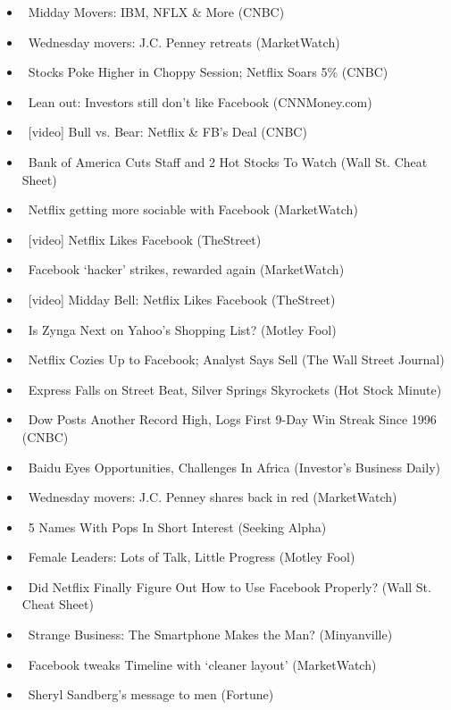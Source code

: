 \documentclass[11pt,asymmetric]{article}
\begin{document}
\begin{itemize}
\item\ Midday Movers: IBM, NFLX \& More (CNBC)
\item\ Wednesday movers: J.C. Penney retreats (MarketWatch)
\item\ Stocks Poke Higher in Choppy Session; Netflix Soars 5\% (CNBC)
\item\ Lean out: Investors still don't like Facebook (CNNMoney.com)
\item\ [video] Bull vs. Bear: Netflix \& FB's Deal (CNBC)
\item\ Bank of America Cuts Staff and 2 Hot Stocks To Watch (Wall St. Cheat Sheet)
\item\ Netflix getting more sociable with Facebook (MarketWatch)
\item\ [video] Netflix Likes Facebook (TheStreet)
\item\ Facebook ‘hacker’ strikes, rewarded again (MarketWatch)
\item\ [video] Midday Bell: Netflix Likes Facebook (TheStreet)
\item\ Is Zynga Next on Yahoo's Shopping List? (Motley Fool)
\item\ Netflix Cozies Up to Facebook; Analyst Says Sell (The Wall Street Journal)
\item\ Express Falls on Street Beat, Silver Springs Skyrockets (Hot Stock Minute)
\item\ Dow Posts Another Record High, Logs First 9-Day Win Streak Since 1996 (CNBC)
\item\ Baidu Eyes Opportunities, Challenges In Africa (Investor's Business Daily)
\item\ Wednesday movers: J.C. Penney shares back in red (MarketWatch)
\item\ 5 Names With Pops In Short Interest (Seeking Alpha)
\item\ Female Leaders: Lots of Talk, Little Progress (Motley Fool)
\item\ Did Netflix Finally Figure Out How to Use Facebook Properly? (Wall St. Cheat Sheet)
\item\ Strange Business: The Smartphone Makes the Man? (Minyanville)
\item\ Facebook tweaks Timeline with `cleaner layout' (MarketWatch)
\item\ Sheryl Sandberg's message to men (Fortune)
\end{itemize}
\end{document}
